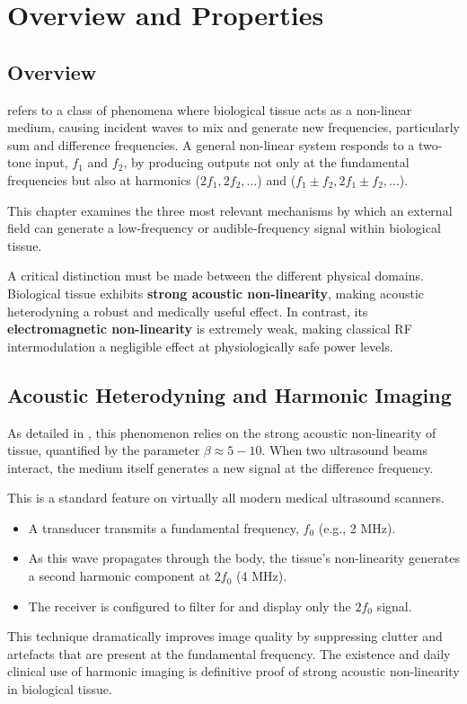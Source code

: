 \section{Overview and Properties}

\subsection{Overview}

 refers to a class of phenomena where biological tissue acts as a non-linear medium, causing incident waves to mix and generate new frequencies, particularly sum and difference frequencies. A general non-linear system responds to a two-tone input, $f_1$ and $f_2$, by producing outputs not only at the fundamental frequencies but also at harmonics ($2f_1, 2f_2, \dots$) and  ($f_1 \pm f_2, 2f_1 \pm f_2, \dots$).

This chapter examines the three most relevant mechanisms by which an external field can generate a low-frequency or audible-frequency signal within biological tissue.

\begin{keyconcept}
    A critical distinction must be made between the different physical domains. Biological tissue exhibits \textbf{strong acoustic non-linearity}, making acoustic heterodyning a robust and medically useful effect. In contrast, its \textbf{electromagnetic non-linearity} is extremely weak, making classical RF intermodulation a negligible effect at physiologically safe power levels.
\end{keyconcept}


\subsection{Acoustic Heterodyning and Harmonic Imaging}

As detailed in , this phenomenon relies on the strong acoustic non-linearity of tissue, quantified by the parameter $\beta \approx 5-10$. When two ultrasound beams interact, the medium itself generates a new signal at the difference frequency.

This is a standard feature on virtually all modern medical ultrasound scanners.
\begin{itemize}
    \item A transducer transmits a fundamental frequency, $f_0$ (e.g., 2 MHz).
    \item As this wave propagates through the body, the tissue's non-linearity generates a second harmonic component at $2f_0$ (4 MHz).
    \item The receiver is configured to filter for and display only the $2f_0$ signal.
\end{itemize}
This technique dramatically improves image quality by suppressing clutter and artefacts that are present at the fundamental frequency. The existence and daily clinical use of harmonic imaging is definitive proof of strong acoustic non-linearity in biological tissue.


